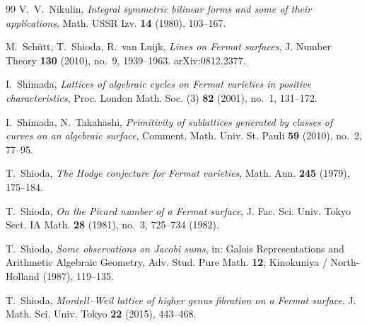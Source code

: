 \documentclass[11pt]{article}
\theoremstyle{definition}
\theoremstyle{remark}
\begin{document}
\begin{thebibliography}{99}
 V.~V.~Nikulin, \emph{Integral symmetric bilinear forms and some of their applications}, Math. USSR Izv. \textbf{14} (1980), 103--167.

 M.~Sch\"utt, T.~Shioda, R.~van Luijk, \emph{Lines on Fermat surfaces}, J. Number Theory \textbf{130} (2010), no.~9, 1939--1963. arXiv:0812.2377.

 I.~Shimada, \emph{Lattices of algebraic cycles on Fermat varieties in positive characteristics}, Proc. London Math. Soc. (3) \textbf{82} (2001), no.~1, 131--172.

 I.~Shimada, N.~Takahashi, \emph{Primitivity of sublattices generated by classes of curves on an algebraic surface}, Comment. Math. Univ. St. Pauli \textbf{59} (2010), no.~2, 77--95.

 T.~Shioda, \emph{The Hodge conjecture for Fermat varieties}, Math. Ann. \textbf{245} (1979), 175--184.

 T.~Shioda, \emph{On the Picard number of a Fermat surface}, J. Fac. Sci. Univ. Tokyo Sect. IA Math. \textbf{28} (1981), no.~3, 725--734 (1982).

 T.~Shioda, \emph{Some observations on Jacobi sums}, in: Galois Representations and Arithmetic Algebraic Geometry, Adv. Stud. Pure Math. \textbf{12}, Kinokuniya / North-Holland (1987), 119--135.

 T.~Shioda, \emph{Mordell--Weil lattice of higher genus fibration on a Fermat surface}, J. Math. Sci. Univ. Tokyo \textbf{22} (2015), 443--468.

\end{thebibliography}
\end{document}
